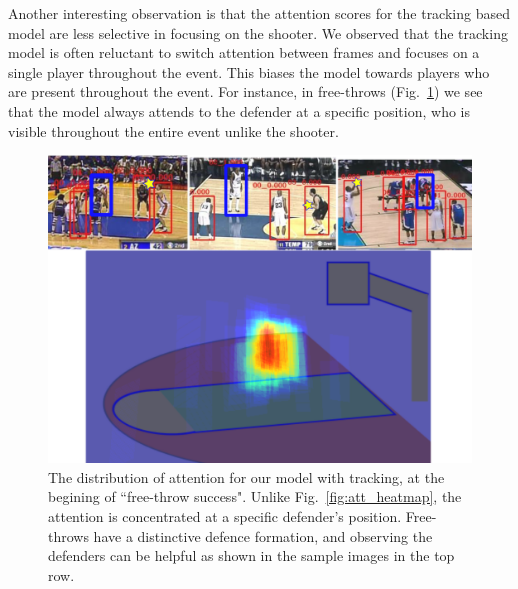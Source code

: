Another interesting observation
is that the attention scores for the tracking based model are less selective in
focusing on the shooter.  We observed that the tracking model is often
reluctant to switch attention between frames and focuses on a single
player throughout the event. This biases the model towards players who are
present throughout the event. For instance, in free-throws
(Fig.~\ref{fig:visual_attention_trackspec}) we see that the model always
attends to the defender at a specific position, who is visible throughout the
entire event unlike the shooter.

\begin{figure}[ht!]
\begin{center}
   \includegraphics[width=0.9\linewidth]{images/track_spec_output.pdf}
\end{center}
  \vspace{-4mm}
\caption{The distribution of attention for our model with tracking,
     at the begining of ``free-throw success". Unlike
     Fig.~\ref{fig:att_heatmap}, the attention is concentrated at a specific
     defender's position. Free-throws have a distinctive defence formation, and
   observing the defenders can be helpful as shown in the sample images in
 the top row.} 
  \vspace{-4mm}
\label{fig:visual_attention_trackspec}
\end{figure}


